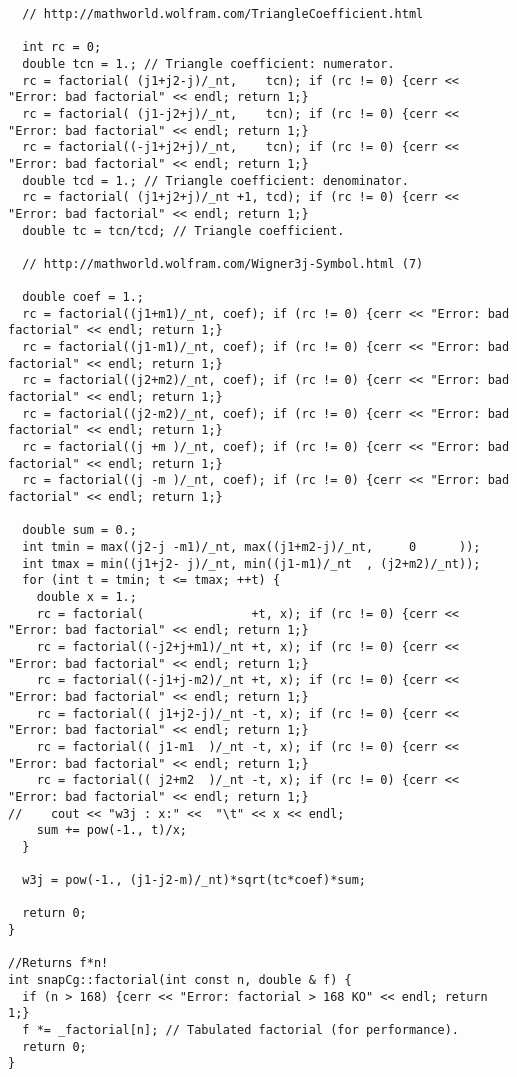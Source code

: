 \documentclass[12pt]{article}
\begin{document}
\begin{lstlisting}
  // http://mathworld.wolfram.com/TriangleCoefficient.html

  int rc = 0;
  double tcn = 1.; // Triangle coefficient: numerator.
  rc = factorial( (j1+j2-j)/_nt,    tcn); if (rc != 0) {cerr << "Error: bad factorial" << endl; return 1;}
  rc = factorial( (j1-j2+j)/_nt,    tcn); if (rc != 0) {cerr << "Error: bad factorial" << endl; return 1;}
  rc = factorial((-j1+j2+j)/_nt,    tcn); if (rc != 0) {cerr << "Error: bad factorial" << endl; return 1;}
  double tcd = 1.; // Triangle coefficient: denominator.
  rc = factorial( (j1+j2+j)/_nt +1, tcd); if (rc != 0) {cerr << "Error: bad factorial" << endl; return 1;}
  double tc = tcn/tcd; // Triangle coefficient.

  // http://mathworld.wolfram.com/Wigner3j-Symbol.html (7)

  double coef = 1.;
  rc = factorial((j1+m1)/_nt, coef); if (rc != 0) {cerr << "Error: bad factorial" << endl; return 1;}
  rc = factorial((j1-m1)/_nt, coef); if (rc != 0) {cerr << "Error: bad factorial" << endl; return 1;}
  rc = factorial((j2+m2)/_nt, coef); if (rc != 0) {cerr << "Error: bad factorial" << endl; return 1;}
  rc = factorial((j2-m2)/_nt, coef); if (rc != 0) {cerr << "Error: bad factorial" << endl; return 1;}
  rc = factorial((j +m )/_nt, coef); if (rc != 0) {cerr << "Error: bad factorial" << endl; return 1;}
  rc = factorial((j -m )/_nt, coef); if (rc != 0) {cerr << "Error: bad factorial" << endl; return 1;}

  double sum = 0.;
  int tmin = max((j2-j -m1)/_nt, max((j1+m2-j)/_nt,     0      ));
  int tmax = min((j1+j2- j)/_nt, min((j1-m1)/_nt  , (j2+m2)/_nt));
  for (int t = tmin; t <= tmax; ++t) {
    double x = 1.;
    rc = factorial(               +t, x); if (rc != 0) {cerr << "Error: bad factorial" << endl; return 1;}
    rc = factorial((-j2+j+m1)/_nt +t, x); if (rc != 0) {cerr << "Error: bad factorial" << endl; return 1;}
    rc = factorial((-j1+j-m2)/_nt +t, x); if (rc != 0) {cerr << "Error: bad factorial" << endl; return 1;}
    rc = factorial(( j1+j2-j)/_nt -t, x); if (rc != 0) {cerr << "Error: bad factorial" << endl; return 1;}
    rc = factorial(( j1-m1  )/_nt -t, x); if (rc != 0) {cerr << "Error: bad factorial" << endl; return 1;}
    rc = factorial(( j2+m2  )/_nt -t, x); if (rc != 0) {cerr << "Error: bad factorial" << endl; return 1;}
//    cout << "w3j : x:" <<  "\t" << x << endl;
    sum += pow(-1., t)/x;
  }

  w3j = pow(-1., (j1-j2-m)/_nt)*sqrt(tc*coef)*sum;

  return 0;
}

//Returns f*n!
int snapCg::factorial(int const n, double & f) {
  if (n > 168) {cerr << "Error: factorial > 168 KO" << endl; return 1;}
  f *= _factorial[n]; // Tabulated factorial (for performance).
  return 0;
}
        \end{lstlisting}
\end{document}
